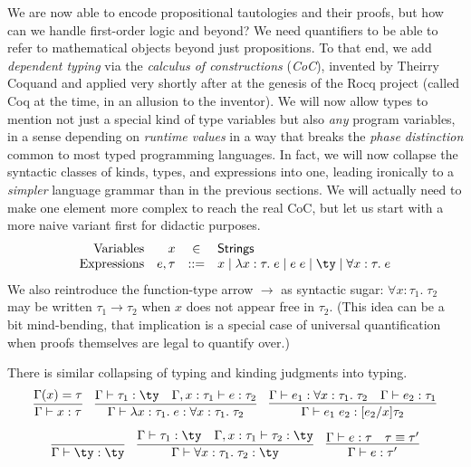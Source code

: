 \documentclass{amsbook}
\theoremstyle{definition}
\theoremstyle{remark}
\numberwithin{section}{chapter}
\numberwithin{equation}{chapter}
\begin{document}
We are now able to encode propositional tautologies and their proofs, but how can we handle first-order logic and beyond?
We need quantifiers to be able to refer to mathematical objects beyond just propositions.
To that end, we add \emph{dependent typing} via the \emph{calculus of constructions} (\emph{CoC}), invented by Theirry Coquand and applied very shortly after at the genesis of the Rocq project (called Coq at the time, in an allusion to the inventor).
We will now allow types to mention not just a special kind of type variables but also \emph{any} program variables, in a sense depending on \emph{runtime values} in a way that breaks the \emph{phase distinction} common to most typed programming languages.
In fact, we will now collapse the syntactic classes of kinds, types, and expressions into one, leading ironically to a \emph{simpler} language grammar than in the previous sections.
We will actually need to make one element more complex to reach the real CoC, but let us start with a more naive variant first for didactic purposes.
$$\begin{array}{rrcl}
  \textrm{Variables} & x &\in& \mathsf{Strings} \\
  \textrm{Expressions} & e, \tau &::=& x \mid \lambda x : \tau. \; e \mid e \; e \mid \ty \mid \forall x : \tau. \; e
\end{array}$$
We also reintroduce the function-type arrow $\to$ as syntactic sugar: $\forall x : \tau_1. \; \tau_2$ may be written $\tau_1 \to \tau_2$ when $x$ does not appear free in $\tau_2$.
(This idea can be a bit mind-bending, that implication is a special case of universal quantification when proofs themselves are legal to quantify over.)

There is similar collapsing of typing and kinding judgments into typing.
$$\infer{\hasty{\Gamma}{x}{\tau}}{
  \msel{\Gamma}{x} = \tau
}
\quad \infer{\hasty{\Gamma}{\lambda x : \tau_1. \; e}{\forall x : \tau_1. \; \tau_2}}{
  \hasty{\Gamma}{\tau_1}{\ty}
  & \hasty{\Gamma, x : \tau_1}{e}{\tau_2}
}
\quad \infer{\hasty{\Gamma}{e_1 \; e_2}{\subst{\tau_2}{x}{e_2}}}{
  \hasty{\Gamma}{e_1}{\forall x : \tau_1. \; \tau_2}
  & \hasty{\Gamma}{e_2}{\tau_1}
}$$
$$\infer{\hasty{\Gamma}{\ty}{\ty}}{}
\quad \infer{\hasty{\Gamma}{\forall x : \tau_1. \; \tau_2}{\ty}}{
  \hasty{\Gamma}{\tau_1}{\ty}
  & \hasty{\Gamma, x : \tau_1}{\tau_2}{\ty}
}
\quad \infer{\hasty{\Gamma}{e}{\tau'}}{
  \hasty{\Gamma}{e}{\tau}
  & \tau \equiv \tau'
}$$
\end{document}
